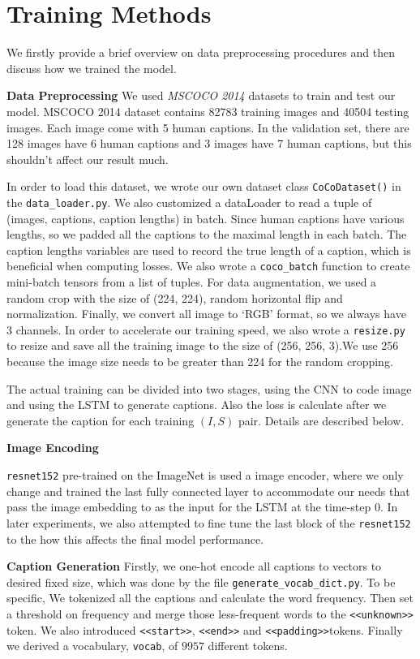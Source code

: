 \documentclass[fleqn,10pt]{SelfArx} %
\begin{document}
\section{Training Methods}

We firstly provide a brief overview on data preprocessing procedures and then discuss how we trained the model.


\textbf{Data Preprocessing}
We used \textit{MSCOCO 2014} datasets to train and test our model. MSCOCO 2014 dataset contains 82783 training images and 40504 testing images. Each image come with 5 human captions. In the validation set, there are 128 images have 6 human captions and 3 images have 7 human captions, but this shouldn’t affect our result much.

In order to load this dataset, we wrote our own dataset class \verb|CoCoDataset()| in the \verb|data_loader.py|. We also customized a dataLoader to read a tuple of (images, captions, caption lengths) in batch. Since human captions have various lengths, so we padded all the captions to the maximal length in each batch. The caption lengths variables are used to record the true length of a caption, which is beneficial when computing losses. We also wrote a \verb|coco_batch| function to create mini-batch tensors from a list of tuples. For data augmentation, we used a random crop with the size of (224, 224), random horizontal flip and normalization. Finally, we convert all image to ‘RGB’ format, so we always have 3 channels. In order to accelerate our training speed, we also wrote a \verb|resize.py| to resize and save all the training image to the size of (256, 256, 3).We use 256 because the image size needs to be greater than 224 for the random cropping. 

The actual training can be divided into two stages, using the CNN to code image and using the LSTM to generate captions. Also the loss is calculate after we generate the caption for each training $(I,S)$ pair. Details are described below.

\textbf{Image Encoding}

\verb|resnet152| pre-trained on the ImageNet is used a image encoder, where we only change and trained the last fully connected layer to accommodate our needs that pass the image embedding to as the input for the LSTM at the time-step 0. In later experiments, we also attempted to fine tune the last block of the \verb|resnet152| to the how this affects the final model performance.


\textbf{Caption Generation}
Firstly, we one-hot encode all captions to vectors to desired fixed size, which was done by the file \verb|generate_vocab_dict.py|. To be specific, We tokenized all the captions and calculate the word frequency. Then set a threshold on frequency and merge those less-frequent words to the \verb|<<unknown>>| token. We also introduced \verb|<<start>>|, \verb|<<end>>| and \verb|<<padding>>|tokens. Finally we derived a vocabulary, \verb|vocab|, of $9957$ different tokens. 
\end{document}

